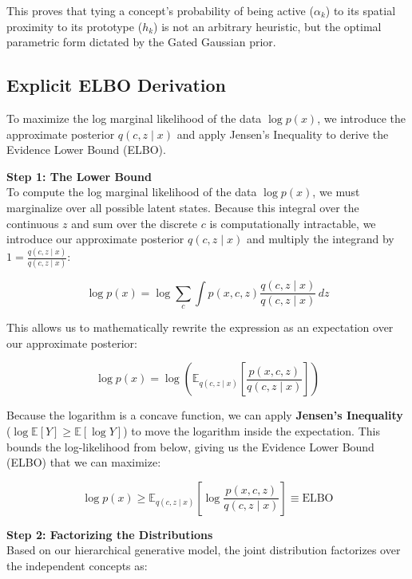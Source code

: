 \documentclass[11pt, a4paper]{article}
\begin{document}


This proves that tying a concept's probability of being active ($\alpha_k$) to its spatial proximity to its prototype ($h_k$) is not an arbitrary heuristic, but the optimal parametric form dictated by the Gated Gaussian prior.

\subsection{Explicit ELBO Derivation}

To maximize the log marginal likelihood of the data $\log p(x)$, we introduce the approximate posterior $q(c, z \mid x)$ and apply Jensen's Inequality to derive the Evidence Lower Bound (ELBO).

\textbf{Step 1: The Lower Bound}\\
To compute the log marginal likelihood of the data $\log p(x)$, we must marginalize over all possible latent states. Because this integral over the continuous $z$ and sum over the discrete $c$ is computationally intractable, we introduce our approximate posterior $q(c, z \mid x)$ and multiply the integrand by $1 = \frac{q(c, z \mid x)}{q(c, z \mid x)}$:

\[
\log p(x) = \log \sum_c \int p(x, c, z) \frac{q(c, z \mid x)}{q(c, z \mid x)} \, dz
\]

This allows us to mathematically rewrite the expression as an expectation over our approximate posterior:

\[
\log p(x) = \log \left( \mathbb{E}_{q(c, z \mid x)}\left[ \frac{p(x, c, z)}{q(c, z \mid x)} \right] \right)
\]

Because the logarithm is a concave function, we can apply \textbf{Jensen's Inequality} ($\log \mathbb{E}[Y] \ge \mathbb{E}[\log Y]$) to move the logarithm inside the expectation. This bounds the log-likelihood from below, giving us the Evidence Lower Bound (ELBO) that we can maximize:

\[
\log p(x) \ge \mathbb{E}_{q(c, z \mid x)}\left[\log \frac{p(x, c, z)}{q(c, z \mid x)}\right] \equiv \text{ELBO}
\]

\textbf{Step 2: Factorizing the Distributions}\\
Based on our hierarchical generative model, the joint distribution factorizes over the independent concepts as:
\end{document}
